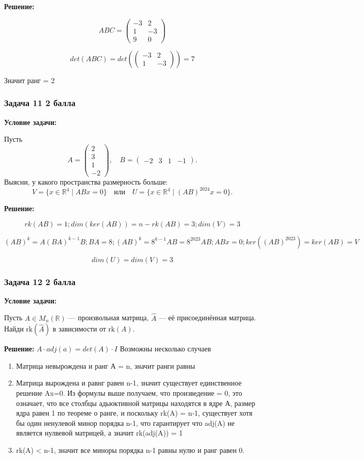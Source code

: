 \documentclass[a4paper,12pt]{article}
\begin{document}
\textbf{Решение:}

\[
ABC = \begin{pmatrix}
-3 & 2 \\
1 & -3 \\
9 & 0
\end{pmatrix}
\]

\[
det(ABC) = det(   \begin{pmatrix}
   -3 & 2 \\
   1 & -3
   \end{pmatrix}) = 7
\]

Значит ранг = 2
\subsubsection{Задача 11 \hfill 2 балла}
\textbf{Условие задачи:}

Пусть
\[
A =
\begin{pmatrix}
2 \\
3 \\
1 \\
-2
\end{pmatrix},
\quad
B =
\begin{pmatrix}
-2 & 3 & 1 & -1
\end{pmatrix}.
\]
Выясни, у какого пространства размерность больше: 
\[
V = \{x \in \mathbb{R}^4 \mid ABx = 0\} \quad \text{или} \quad U = \{x \in \mathbb{R}^4 \mid (AB)^{2024}x = 0\}.
\]

\textbf{Решение:}

\[
rk(AB) = 1; dim(ker(AB)) = n - rk(AB) = 3; dim(V) = 3
\]

\[
(AB)^k = A(BA)^{k-1}B; BA = 8; (AB)^k = 8^{k-1}AB = 8^{2023}AB; ABx=0; ker((AB)^2023) = ker(AB) = V
\]

\[
dim(U) = dim(V) = 3
\]


\subsubsection{Задача 12 \hfill 2 балла}
\textbf{Условие задачи:}

Пусть \( A \in M_n(\mathbb{R}) \) — произвольная матрица, \( \hat{A} \) — её присоединённая матрица. Найди \( \text{rk}(\hat{A}) \) в зависимости от \( \text{rk}(A) \).

\textbf{Решение:}
$A\cdot adj(a) = det(A)\cdot I$ Возможны несколько случаев
\begin{enumerate}
    \item Матрица невырождена и ранг А = n, значит ранги равны
    \item Матрица вырождена и равнг равен n-1, значит существует единственное решение Ax=0. Из формулы выше получаем, что произведение = 0, это означает, что все столбцы адьюктивной матрицы находятся в ядре А, размер ядра равен 1 по теореме о ранге, и поскольку rk(A) = n-1, существует хотя бы один ненулевой минор порядка n-1, что гарантирует что adj(A) не является нулвевой матрицей, а значит rk(adj(A)) = 1
    \item rk(A) < n-1, значит все миноры порядка n-1 равны нулю и ранг равен 0.
\end{enumerate}
\end{document}
